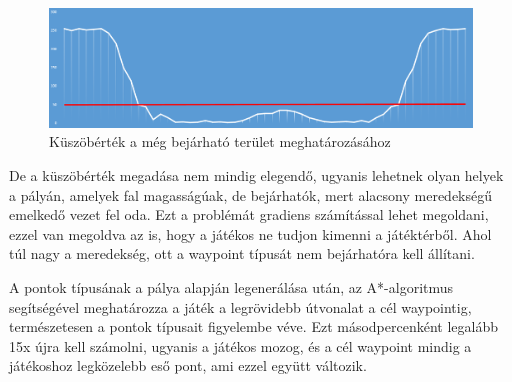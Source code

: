 \begin{figure}[h]
\centering
\includegraphics[scale=0.44]{kepek/magassagmezo_kuszobertek_diagram.png}
\caption{Küszöbérték a még bejárható terület meghatározásához}
\label{fig:kuszobertek}
\end{figure}

De a küszöbérték megadása nem mindig elegendő, ugyanis lehetnek olyan helyek a pályán, amelyek fal magasságúak, de bejárhatók, mert alacsony meredekségű emelkedő vezet fel oda. Ezt a problémát gradiens számítással lehet megoldani, ezzel van megoldva az is, hogy a játékos ne tudjon kimenni a játéktérből. Ahol túl nagy a meredekség, ott a waypoint típusát nem bejárhatóra kell állítani.

\newpage
A pontok típusának a pálya alapján legenerálása után, az A*-algoritmus segítségével meghatározza a játék a legrövidebb útvonalat a cél waypointig, természetesen a pontok típusait figyelembe véve. Ezt másodpercenként legalább 15x újra kell számolni, ugyanis a játékos mozog, és a cél waypoint mindig a játékoshoz legközelebb eső pont, ami ezzel együtt változik.
